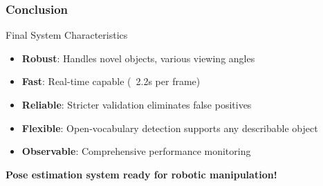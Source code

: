 \documentclass[serif, aspectratio=169, 9pt]{beamer}
\begin{document}
\begin{frame}
\frametitle{Conclusion}
    \begin{block}{Final System Characteristics}
        \begin{itemize}
            \item \textbf{Robust}: Handles novel objects, various viewing angles
            \item \textbf{Fast}: Real-time capable (~2.2s per frame)
            \item \textbf{Reliable}: Stricter validation eliminates false positives
            \item \textbf{Flexible}: Open-vocabulary detection supports any describable object
            \item \textbf{Observable}: Comprehensive performance monitoring
        \end{itemize}
    \end{block}
    \vspace{0.3cm}
    \begin{center}
        \textbf{Pose estimation system ready for robotic manipulation!}
    \end{center}
\end{frame}
\end{document}
